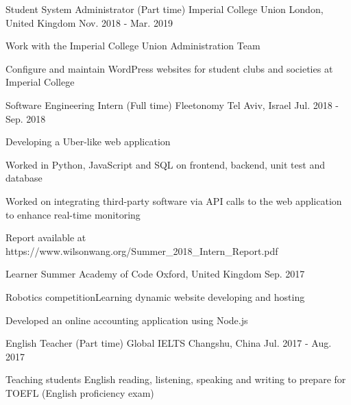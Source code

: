 
\begin{cventries}
  \cventry
    {Student System Administrator (Part time)} %
    {Imperial College Union} %
    {London, United Kingdom} %
    {Nov. 2018 - Mar. 2019} %
    {
      \begin{cvitems} %
        \item {Work with the Imperial College Union Administration Team}
        \item {Configure and maintain WordPress websites for student clubs and societies at Imperial College}
      \end{cvitems}
    }

  \cventry
    {Software Engineering Intern (Full time)} %
    {Fleetonomy} %
    {Tel Aviv, Israel} %
    {Jul. 2018 - Sep. 2018} %
    {
      \begin{cvitems} %
        \item {Developing a Uber-like web application}
        \item {Worked in Python, JavaScript and SQL on frontend, backend, unit test and database}
        \item {Worked on integrating third-party software via API calls to the web application to enhance real-time
        monitoring}
        \item {Report available at https://www.wilsonwang.org/Summer\_2018\_Intern\_Report.pdf}
      \end{cvitems}
    }
    
    \cventry
    {Learner} %
    {Summer Academy of Code} %
    {Oxford, United Kingdom} %
    {Sep. 2017} %
    {
      \begin{cvitems} %
        \item {Robotics competitionLearning dynamic website developing and hosting}
        \item {Developed an online accounting application using Node.js}
      \end{cvitems}
    }

  \cventry
    {English Teacher (Part time)} %
    {Global IELTS} %
    {Changshu, China} %
    {Jul. 2017 - Aug. 2017} %
    {
      \begin{cvitems} %
        \item {Teaching students English reading, listening, speaking and writing to prepare for TOEFL (English
        proficiency exam)}
      \end{cvitems}
    }
    

\end{cventries}
